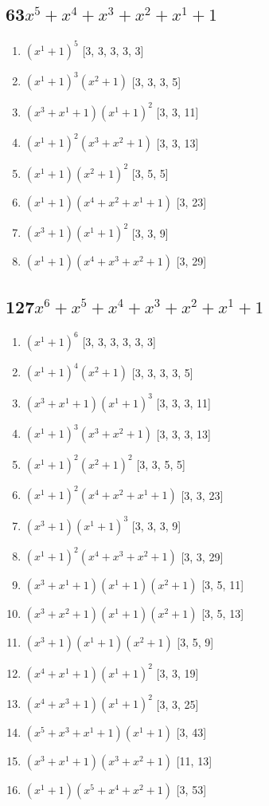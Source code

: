 \documentclass[10pt,twocolumn]{article}
\begin{document}
\subsection*{63$x^{5} + x^{4} + x^{3} + x^{2} + x^{1} + 1$  } 
\begin{enumerate}
\item $(x^{1} + 1)^{5}$  [3, 3, 3, 3, 3]
\item $(x^{1} + 1)^{3}(x^{2} + 1)$  [3, 3, 3, 5]
\item $(x^{3} + x^{1} + 1)(x^{1} + 1)^{2}$  [3, 3, 11]
\item $(x^{1} + 1)^{2}(x^{3} + x^{2} + 1)$  [3, 3, 13]
\item $(x^{1} + 1)(x^{2} + 1)^{2}$  [3, 5, 5]
\item $(x^{1} + 1)(x^{4} + x^{2} + x^{1} + 1)$  [3, 23]
\item $(x^{3} + 1)(x^{1} + 1)^{2}$  [3, 3, 9]
\item $(x^{1} + 1)(x^{4} + x^{3} + x^{2} + 1)$  [3, 29]
\end{enumerate}

\subsection*{127$x^{6} + x^{5} + x^{4} + x^{3} + x^{2} + x^{1} + 1$  } 
\begin{enumerate}
\item $(x^{1} + 1)^{6}$  [3, 3, 3, 3, 3, 3]
\item $(x^{1} + 1)^{4}(x^{2} + 1)$  [3, 3, 3, 3, 5]
\item $(x^{3} + x^{1} + 1)(x^{1} + 1)^{3}$  [3, 3, 3, 11]
\item $(x^{1} + 1)^{3}(x^{3} + x^{2} + 1)$  [3, 3, 3, 13]
\item $(x^{1} + 1)^{2}(x^{2} + 1)^{2}$  [3, 3, 5, 5]
\item $(x^{1} + 1)^{2}(x^{4} + x^{2} + x^{1} + 1)$  [3, 3, 23]
\item $(x^{3} + 1)(x^{1} + 1)^{3}$  [3, 3, 3, 9]
\item $(x^{1} + 1)^{2}(x^{4} + x^{3} + x^{2} + 1)$  [3, 3, 29]
\item $(x^{3} + x^{1} + 1)(x^{1} + 1)(x^{2} + 1)$  [3, 5, 11]
\item $(x^{3} + x^{2} + 1)(x^{1} + 1)(x^{2} + 1)$  [3, 5, 13]
\item $(x^{3} + 1)(x^{1} + 1)(x^{2} + 1)$  [3, 5, 9]
\item $(x^{4} + x^{1} + 1)(x^{1} + 1)^{2}$  [3, 3, 19]
\item $(x^{4} + x^{3} + 1)(x^{1} + 1)^{2}$  [3, 3, 25]
\item $(x^{5} + x^{3} + x^{1} + 1)(x^{1} + 1)$  [3, 43]
\item $(x^{3} + x^{1} + 1)(x^{3} + x^{2} + 1)$  [11, 13]
\item $(x^{1} + 1)(x^{5} + x^{4} + x^{2} + 1)$  [3, 53]
\end{enumerate}
\end{document}
